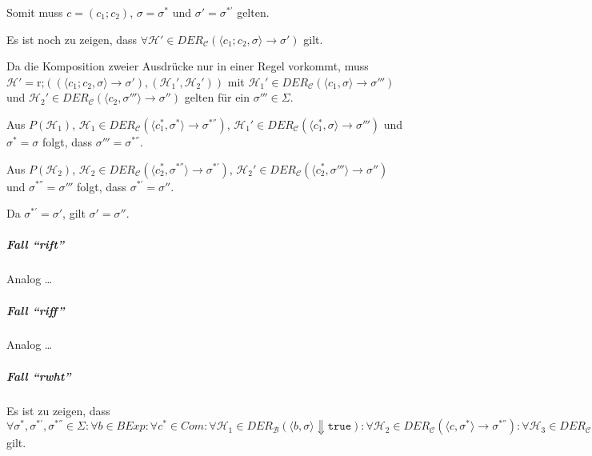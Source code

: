 																	Somit muss $ c = (c _ 1 ; c _ 2) $, $ \sigma = \sigma ^ * $ und $ \sigma' = \sigma ^ {*'} $ gelten.

																	Es ist noch zu zeigen, dass $ \forall \mathcal{H}' \in \textit{DER} _ \mathcal{C} (\langle c _ 1 ; c _ 2, \sigma \rangle \rightarrow \sigma') $ gilt.

																	Da die Komposition zweier Ausdrücke nur in einer Regel vorkommt, muss $ \mathcal{H}' = \text{r;}((\langle c _ 1 ; c _ 2, \sigma \rangle \rightarrow \sigma'), (\mathcal{H} _ 1 ', \mathcal{H} _ 2 ')) $ mit $ \mathcal{H} _ 1 ' \in \textit{DER} _ \mathcal{C} (\langle c _ 1, \sigma \rangle \rightarrow \sigma''') $ und $ \mathcal{H} _ 2 ' \in \textit{DER} _ \mathcal{C} (\langle c _ 2, \sigma''' \rangle \rightarrow \sigma'') $ gelten für ein $ \sigma''' \in \Sigma $.

																	Aus $ P(\mathcal{H} _ 1) $, $ \mathcal{H} _ 1 \in \textit{DER} _ \mathcal{C} (\langle c _ 1 ^ *, \sigma ^ * \rangle \rightarrow \sigma ^ {*''}) $, $ \mathcal{H} _ 1 ' \in \textit{DER} _ \mathcal{C} (\langle c _ 1 ^ *, \sigma \rangle \rightarrow \sigma''') $ und $ \sigma ^ * = \sigma $ folgt, dass $ \sigma''' = \sigma ^ {*''} $.

																	Aus $ P(\mathcal{H} _ 2) $, $ \mathcal{H} _ 2 \in \textit{DER} _ \mathcal{C} (\langle c _ 2 ^ *, \sigma ^ {*''} \rangle \rightarrow \sigma ^ {*'}) $, $ \mathcal{H} _ 2 ' \in \textit{DER} _ \mathcal{C} (\langle c _ 2 ^ *, \sigma''' \rangle \rightarrow \sigma'' ) $ und  $ \sigma ^ {*''} = \sigma''' $ folgt, dass $ \sigma ^ {*'} = \sigma'' $.

																	Da $ \sigma ^ {*'} = \sigma' $, gilt $ \sigma' = \sigma'' $.

																\subparagraph{Fall \enquote{rift}}
																	Analog \dots

																\subparagraph{Fall \enquote{riff}}
																	Analog \dots

																\subparagraph{Fall \enquote{rwht}}
																	Es ist zu zeigen, dass $ \forall \sigma ^ *, \sigma ^ {*'}, \sigma ^ {*''} \in \Sigma : \forall b \in \textit{BExp} : \forall c ^ * \in \textit{Com} : \forall \mathcal{H} _ 1 \in \textit{DER} _ \mathcal{B} (\langle b, \sigma \rangle \Downarrow \texttt{true}) : \forall \mathcal{H} _ 2 \in \textit{DER} _ \mathcal{C} (\langle c, \sigma ^ * \rangle \rightarrow \sigma ^ {*''}) : \forall \mathcal{H} _ 3 \in \textit{DER} _ \mathcal{C} (\langle \texttt{while } b \texttt{ do } c \texttt{ od}, \sigma ^ {*''} \rangle \rightarrow \sigma ^ {*'}) : P(\mathcal{H} _ 2) \land P(\mathcal{H} _ 3) \implies P(\text{rwht})((\langle \texttt{while } b \texttt{ do } c \texttt{ od}, \sigma ^ * \rangle \rightarrow \sigma ^ {*'}), (\mathcal{H} _ 1, \mathcal{H} _ 2, \mathcal{H} _ 3)) $ gilt.

